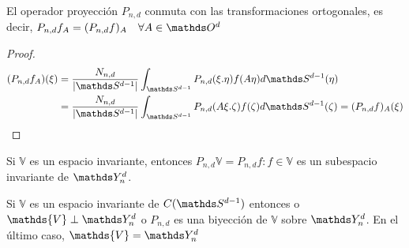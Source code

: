 \begin{prop}El operador proyección $P_{n,d}$ conmuta con las transformaciones ortogonales, es decir, $P_{n,d}f_A=(P_{n,d}f)_A \quad \forall A\in\orto$
\end{prop}
\begin{proof}
	\begin{gather*}
	\begin{aligned}
	(P_{n,d}f_A) (\xi) &= \frac{N_{n,d}}{|\sphere|} \int_{\sphere}P_{n,d}(\xi.\eta)f(A\eta)d\sphere(\eta) \\&= \frac{N_{n,d}}{|\sphere|} \int_{\sphere}P_{n,d}(A\xi.\zeta)f(\zeta)d\sphere(\zeta) =  
	(P_{n,d}f)_A (\xi)
	\end{aligned}
	\end{gather*}
	
\end{proof}
\begin{cor}Si $\mathds{V}$ es un espacio invariante, entonces $P_{n,d}\mathds{V} = {P_{n,d}f : f\in\mathds{V}}$ es un subespacio invariante de $\spharm$.
\end{cor}
\begin{thm}Si $\mathds{V}$ es un espacio invariante de $C(\sphere)$ entonces o $\mathds{V} \perp \spharm$ o $P_{n,d}$ es una biyección de $\mathds{V}$ sobre $\spharm$. En el último caso, $\mathds{V}=\spharm$
\end{thm}
